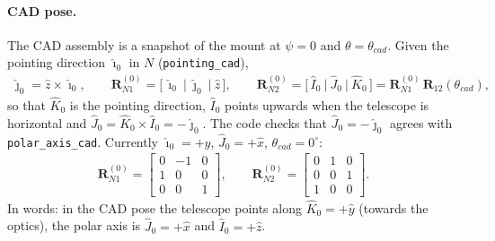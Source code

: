 \documentclass[10pt,a4paper]{article}
\numberwithin{equation}{section}
\begin{document}
\paragraph{CAD pose.} The CAD assembly is a snapshot of the mount at $\psi = 0$ and $\theta = \theta_{cad}$. Given the pointing direction $\hat\imath_0$ in $N$ (\texttt{pointing\_cad}),
\begin{gather}
\hat\jmath_0 = \hat z\times\hat\imath_0, \qquad \mathbf R_{N1}^{(0)} = \bigl[\,\hat\imath_0\ \big|\ \hat\jmath_0\ \big|\ \hat z\,\bigr], \qquad \mathbf R_{N2}^{(0)} = \bigl[\,\hat I_0\ \big|\ \hat J_0\ \big|\ \hat K_0\,\bigr] = \mathbf R_{N1}^{(0)}\,\mathbf R_{12}(\theta_{cad}),
\end{gather}
so that $\hat K_0$ is the pointing direction, $\hat I_0$ points upwards when the telescope is horizontal and $\hat J_0 = \hat K_0\times\hat I_0 = -\hat\jmath_0$. 
The code checks that $\hat J_0 = -\hat\jmath_0$ agrees with \texttt{polar\_axis\_cad}. Currently $\hat\imath_0 = +\hat{y}$, $\hat J_0 = +\hat{x}$, $\theta_{cad} = 0^\circ$:
\begin{gather}
\mathbf R_{N1}^{(0)} = \begin{bmatrix}0 & -1 & 0 \\ 1 & 0 & 0 \\ 0 & 0 & 1\end{bmatrix}, \qquad \mathbf R_{N2}^{(0)} = \begin{bmatrix}0 & 1 & 0 \\ 0 & 0 & 1 \\ 1 & 0 & 0\end{bmatrix}.
\end{gather}
In words: in the CAD pose the telescope points along $\hat K_0 = +\hat{y}$ (towards the optics), the polar axis is $\hat J_0 = +\hat{x}$ and $\hat I_0 = +\hat{z}$.
\end{document}
